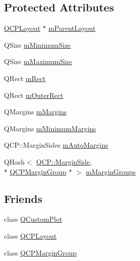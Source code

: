 \subsection*{Protected Attributes}
\begin{DoxyCompactItemize}
\item 
\hyperlink{class_q_c_p_layout}{Q\-C\-P\-Layout} $\ast$ \hyperlink{class_q_c_p_layout_element_ae7c75c25549608bd688bdb65d4c38066}{m\-Parent\-Layout}
\item 
Q\-Size \hyperlink{class_q_c_p_layout_element_affef747c81632de33f08483b7fd10d01}{m\-Minimum\-Size}
\item 
Q\-Size \hyperlink{class_q_c_p_layout_element_a64a387973fd4addac842028c89088998}{m\-Maximum\-Size}
\item 
Q\-Rect \hyperlink{class_q_c_p_layout_element_ad8896f05550389f7b9e92c9e6cdf6e01}{m\-Rect}
\item 
Q\-Rect \hyperlink{class_q_c_p_layout_element_a07bb4973379e75cb0fa5b032c1d24afd}{m\-Outer\-Rect}
\item 
Q\-Margins \hyperlink{class_q_c_p_layout_element_ac2a32b99ee527ca5dfff9da03628fe94}{m\-Margins}
\item 
Q\-Margins \hyperlink{class_q_c_p_layout_element_a5ba71f25d1af4bb092b28df618538e63}{m\-Minimum\-Margins}
\item 
Q\-C\-P\-::\-Margin\-Sides \hyperlink{class_q_c_p_layout_element_af61c70354d1275778d68206b2a1b2d36}{m\-Auto\-Margins}
\item 
Q\-Hash$<$ \hyperlink{namespace_q_c_p_a7e487e3e2ccb62ab7771065bab7cae54}{Q\-C\-P\-::\-Margin\-Side}, \\*
\hyperlink{class_q_c_p_margin_group}{Q\-C\-P\-Margin\-Group} $\ast$ $>$ \hyperlink{class_q_c_p_layout_element_aeafbbc1130e02eee663c5326761fc963}{m\-Margin\-Groups}
\end{DoxyCompactItemize}
\subsection*{Friends}
\begin{DoxyCompactItemize}
\item 
class \hyperlink{class_q_c_p_layout_element_a1cdf9df76adcfae45261690aa0ca2198}{Q\-Custom\-Plot}
\item 
class \hyperlink{class_q_c_p_layout_element_a588aac0a0d721f6c5f10126d8596a20f}{Q\-C\-P\-Layout}
\item 
class \hyperlink{class_q_c_p_layout_element_ad077a686e85ab6fa03dcb2fd37fc499a}{Q\-C\-P\-Margin\-Group}
\end{DoxyCompactItemize}



